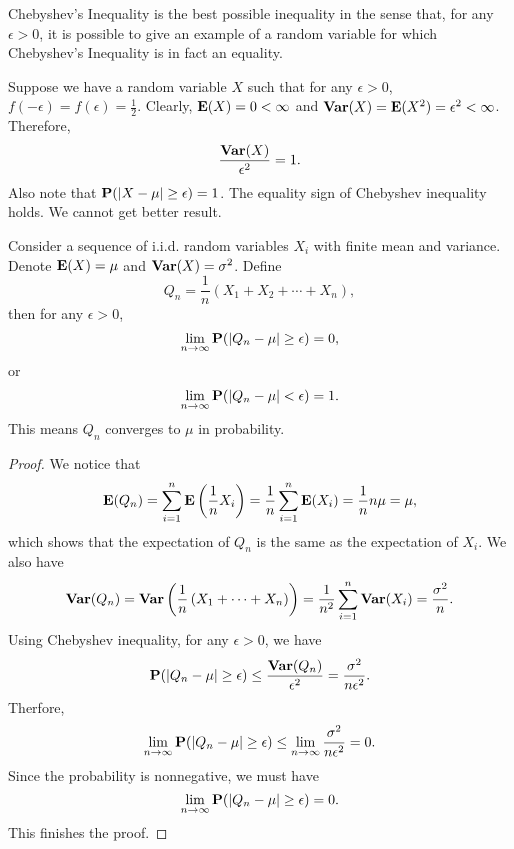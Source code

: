 Chebyshev’s Inequality is the best possible inequality in the sense that, for any $\epsilon > 0$, it is possible to give an example of a random variable for which Chebyshev’s Inequality is in fact an equality. 
\begin{example}
Suppose we have a random variable $X$ such that for any $\epsilon > 0$, $f(-\epsilon) = f(\epsilon) = \frac{1}{2}$. Clearly, $\mathbf{E}(X) = 0 < \infty$ and $\mathbf{Var}(X) = \mathbf{E}(X^2) = \epsilon^2 < \infty$. Therefore,
\begin{equation*}
    \frac{\mathbf{Var}(X)}{\epsilon^2} = 1.
\end{equation*}
Also note that $\mathbf{P}(\left\vert X-\mu \right\vert \geq \epsilon) = 1$. The equality sign of Chebyshev inequality holds. We cannot get better result.
\end{example}

\begin{theorem}
Consider a sequence of i.i.d. random variables $X_i$ with finite mean and variance. Denote $\mathbf{E}(X) = \mu$ and $\mathbf{Var}(X) = \sigma^2$. Define 
\begin{equation*}
    Q_n = \frac{1}{n}\left( X_1 + X_2 + \cdots + X_n \right),
\end{equation*}
then for any $\epsilon > 0$, 
\begin{equation*}
    \lim_{n\to\infty} \mathbf{P}(\left\vert Q_n - \mu \right\vert \geq \epsilon ) = 0,
\end{equation*}
or 
\begin{equation*}
    \lim_{n\to\infty} \mathbf{P}(\left\vert Q_n - \mu \right\vert < \epsilon) = 1.
\end{equation*}
This means $Q_n$ converges to $\mu$ in probability.
\end{theorem}

\begin{proof}
We notice that 
\begin{equation*}
    \mathbf{E}(Q_n) = \sum_{i=1}^n \mathbf{E}\left( \frac{1}{n} X_i \right) = \frac{1}{n} \sum_{i=1}^n \mathbf{E}(X_i) = \frac{1}{n} n\mu = \mu,
\end{equation*}
which shows that the expectation of $Q_n$ is the same as the expectation of $X_i$. We also have
\begin{equation*}
    \mathbf{Var}(Q_n) = \mathbf{Var} \left( \frac{1}{n} \left(X_1 + \cdots + X_n \right) \right) = \frac{1}{n^2} \sum_{i=1}^n \mathbf{Var}(X_i) = \frac{\sigma^2}{n}.
\end{equation*}
Using Chebyshev inequality, for any $\epsilon > 0$, we have
\begin{equation*}
    \mathbf{P}(\left\vert Q_n-\mu \right\vert\geq \epsilon) \leq \frac{\mathbf{Var}(Q_n)}{\epsilon^2} = \frac{\sigma^2}{n\epsilon^2}.
\end{equation*}
Therfore,
\begin{equation*}
    \lim_{n\to\infty} \mathbf{P}(\left\vert Q_n-\mu \right\vert\geq \epsilon) \leq \lim_{n\to\infty} \frac{\sigma^2}{n\epsilon^2} = 0.
\end{equation*}
Since the probability is nonnegative, we must have
\begin{equation*}
    \lim_{n\to\infty} \mathbf{P}(\left\vert Q_n-\mu \right\vert\geq \epsilon) = 0.
\end{equation*}
This finishes the proof.
\end{proof}

